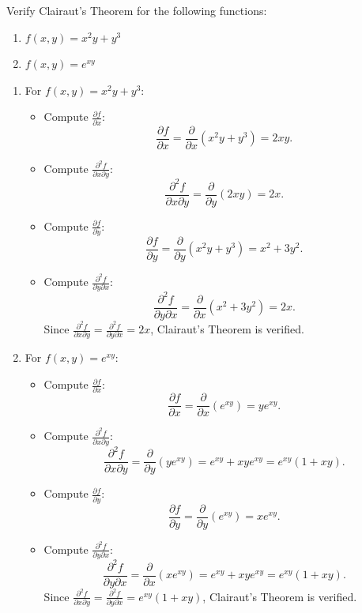 \exampleline
\begin{example}
Verify Clairaut's Theorem for the following functions:
\begin{enumerate}
    \item \( f(x, y) = x^2y + y^3 \)
    \item \( f(x, y) = e^{xy} \)
\end{enumerate}

\begin{solution}
\begin{enumerate}
    \item For \( f(x, y) = x^2y + y^3 \):
    \begin{itemize}
        \item Compute \( \frac{\partial f}{\partial x} \):
        \[
        \frac{\partial f}{\partial x} = \frac{\partial}{\partial x} (x^2y + y^3) = 2xy.
        \]
        \item Compute \( \frac{\partial^2 f}{\partial x \partial y} \):
        \[
        \frac{\partial^2 f}{\partial x \partial y} = \frac{\partial}{\partial y} (2xy) = 2x.
        \]
        \item Compute \( \frac{\partial f}{\partial y} \):
        \[
        \frac{\partial f}{\partial y} = \frac{\partial}{\partial y} (x^2y + y^3) = x^2 + 3y^2.
        \]
        \item Compute \( \frac{\partial^2 f}{\partial y \partial x} \):
        \[
        \frac{\partial^2 f}{\partial y \partial x} = \frac{\partial}{\partial x} (x^2 + 3y^2) = 2x.
        \]
        Since \( \frac{\partial^2 f}{\partial x \partial y} = \frac{\partial^2 f}{\partial y \partial x} = 2x \), Clairaut's Theorem is verified.

    \end{itemize}

    \item For \( f(x, y) = e^{xy} \):
    \begin{itemize}
        \item Compute \( \frac{\partial f}{\partial x} \):
        \[
        \frac{\partial f}{\partial x} = \frac{\partial}{\partial x} (e^{xy}) = ye^{xy}.
        \]
        \item Compute \( \frac{\partial^2 f}{\partial x \partial y} \):
        \[
        \frac{\partial^2 f}{\partial x \partial y} = \frac{\partial}{\partial y} (ye^{xy}) = e^{xy} + xye^{xy} = e^{xy}(1 + xy).
        \]
        \item Compute \( \frac{\partial f}{\partial y} \):
        \[
        \frac{\partial f}{\partial y} = \frac{\partial}{\partial y} (e^{xy}) = xe^{xy}.
        \]
        \item Compute \( \frac{\partial^2 f}{\partial y \partial x} \):
        \[
        \frac{\partial^2 f}{\partial y \partial x} = \frac{\partial}{\partial x} (xe^{xy}) = e^{xy} + xye^{xy} = e^{xy}(1 + xy).
        \]
        Since \( \frac{\partial^2 f}{\partial x \partial y} = \frac{\partial^2 f}{\partial y \partial x} = e^{xy}(1 + xy) \), Clairaut's Theorem is verified.
    \end{itemize}
\end{enumerate}
\end{solution}
\end{example}



